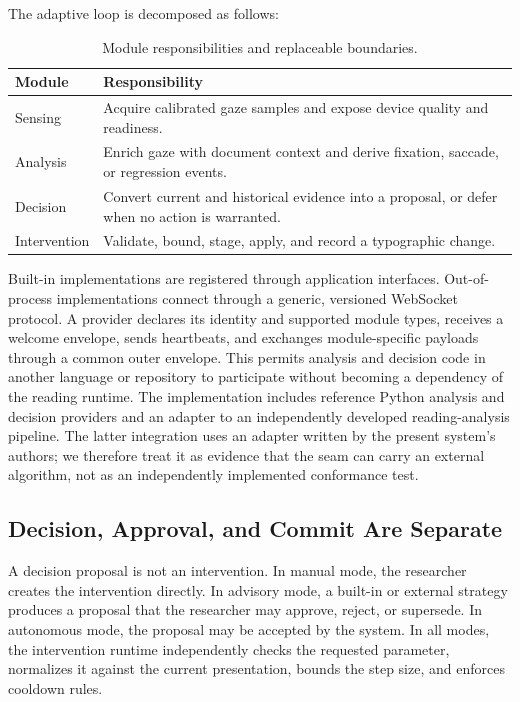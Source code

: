 \documentclass[sigconf,review,anonymous]{acmart}
\begin{document}
The adaptive loop is decomposed as follows:

\begin{table}[t]
    \caption{Module responsibilities and replaceable boundaries.}
    \label{tab:modules}
    \small
    \begin{tabular}{p{}p{}}
        \toprule
        Module & Responsibility \\
        \midrule
        Sensing & Acquire calibrated gaze samples and expose device quality and readiness. \\
        Analysis & Enrich gaze with document context and derive fixation, saccade, or regression events. \\
        Decision & Convert current and historical evidence into a proposal, or defer when no action is warranted. \\
        Intervention & Validate, bound, stage, apply, and record a typographic change. \\
        \bottomrule
    \end{tabular}
\end{table}

Built-in implementations are registered through application interfaces.
Out-of-process implementations connect through a generic, versioned WebSocket protocol.
A provider declares its identity and supported module types, receives a welcome envelope, sends heartbeats, and exchanges module-specific payloads through a common outer envelope.
This permits analysis and decision code in another language or repository to participate without becoming a dependency of the reading runtime.
The implementation includes reference Python analysis and decision providers and an adapter to an independently developed reading-analysis pipeline.
The latter integration uses an adapter written by the present system's authors; we therefore treat it as evidence that the seam can carry an external algorithm, not as an independently implemented conformance test.

\subsection{Decision, Approval, and Commit Are Separate}

A decision proposal is not an intervention.
In manual mode, the researcher creates the intervention directly.
In advisory mode, a built-in or external strategy produces a proposal that the researcher may approve, reject, or supersede.
In autonomous mode, the proposal may be accepted by the system.
In all modes, the intervention runtime independently checks the requested parameter, normalizes it against the current presentation, bounds the step size, and enforces cooldown rules.
\end{document}

